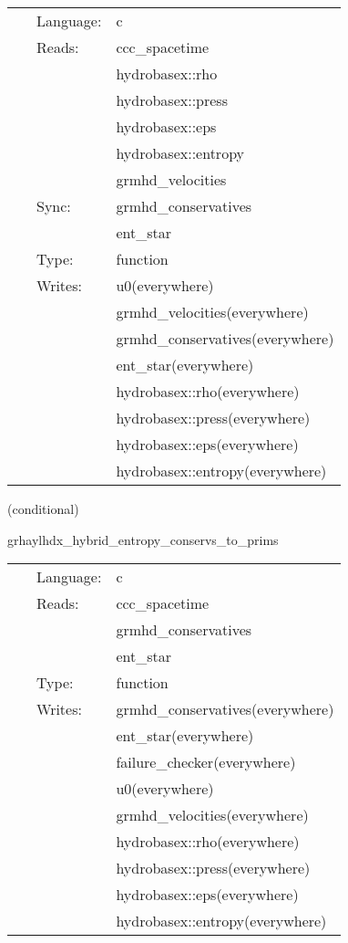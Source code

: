  \begin{tabular*}{160mm}{cll} 
~ & Language:  & c \\ 
~ & Reads:  & ccc\_spacetime \\ 
~& ~ &hydrobasex::rho\\ 
~& ~ &hydrobasex::press\\ 
~& ~ &hydrobasex::eps\\ 
~& ~ &hydrobasex::entropy\\ 
~& ~ &grmhd\_velocities\\ 
~ & Sync:  & grmhd\_conservatives \\ 
~& ~ &ent\_star\\ 
~ & Type:  & function \\ 
~ & Writes:  & u0(everywhere) \\ 
~& ~ &grmhd\_velocities(everywhere)\\ 
~& ~ &grmhd\_conservatives(everywhere)\\ 
~& ~ &ent\_star(everywhere)\\ 
~& ~ &hydrobasex::rho(everywhere)\\ 
~& ~ &hydrobasex::press(everywhere)\\ 
~& ~ &hydrobasex::eps(everywhere)\\ 
~& ~ &hydrobasex::entropy(everywhere)\\ 
\end{tabular*} 


\vspace{5mm}

   (conditional) 

\hspace{5mm} grhaylhdx\_hybrid\_entropy\_conservs\_to\_prims 

\hspace{5mm}{\it entropy+hybrid version of grhaylhdx\_conservs\_to\_prims } 


\hspace{5mm}

 \begin{tabular*}{160mm}{cll} 
~ & Language:  & c \\ 
~ & Reads:  & ccc\_spacetime \\ 
~& ~ &grmhd\_conservatives\\ 
~& ~ &ent\_star\\ 
~ & Type:  & function \\ 
~ & Writes:  & grmhd\_conservatives(everywhere) \\ 
~& ~ &ent\_star(everywhere)\\ 
~& ~ &failure\_checker(everywhere)\\ 
~& ~ &u0(everywhere)\\ 
~& ~ &grmhd\_velocities(everywhere)\\ 
~& ~ &hydrobasex::rho(everywhere)\\ 
~& ~ &hydrobasex::press(everywhere)\\ 
~& ~ &hydrobasex::eps(everywhere)\\ 
~& ~ &hydrobasex::entropy(everywhere)\\ 
\end{tabular*} 


